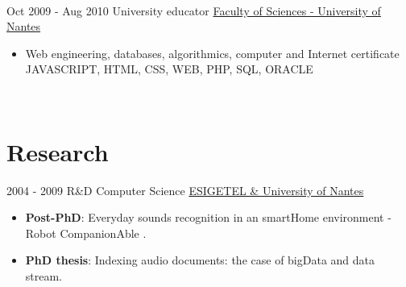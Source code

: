 \documentclass[letterpaper]{twentysecondcv_en} %
\begin{document}
\begin{twenty}
	   \\
	    \twentyitem
	    {Oct 2009 -}
	    {Aug 2010}
	    {University educator}
	    {\href{}{Faculty of Sciences - University of Nantes }}
	    {}
	    {
	    \begin{itemize}
		\item Web engineering, databases, algorithmics, computer and Internet certificate
	 \medskip   \newline \footnotesize  JAVASCRIPT, HTML, CSS, WEB, PHP, SQL, ORACLE
	    \end{itemize}
	    }

	   \\		
\end{twenty}

\section{Research}
\begin{twenty}
	\twentyitem
    	{2004 - 2009}
		{}
        {R\&D Computer Science}
        {\href{https://www.univ-nantes.fr/}{ESIGETEL \& University of Nantes}}
        {}
	       {       
	        {
	       \begin{itemize}
	       \item \textbf{Post-PhD}: Everyday sounds recognition in an smartHome environment - Robot CompanionAble .
	       \item	\textbf{PhD thesis}: Indexing audio documents: the case of bigData and data stream.
	      \end{itemize}
			}
	       }
  
\end{twenty}

\end{document}

